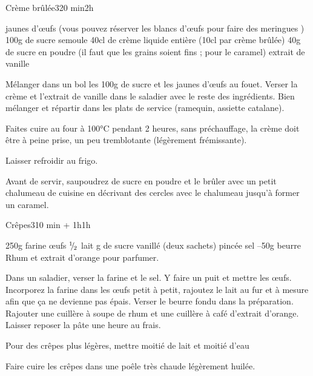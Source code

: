 \begin{recette}{Crème brûlée}{3}{20 min}{2h}
\begin{ingredients}[4 pers.]
 jaunes d'œufs (vous pouvez réserver les blancs d'œufs pour faire des meringues )
\ingredient 100g de sucre semoule
\ingredient 40cl de crème liquide entière (10cl par crème brûlée)
\ingredient 40g de sucre en poudre (il faut que les grains soient fins ; pour le caramel)
\ingredient extrait de vanille
\end{ingredients}

\begin{preparation}
\etape Mélanger dans un bol les 100g de sucre et les jaunes d'œufs au fouet.
\etape Verser la crème et l'extrait de vanille dans le saladier avec le reste des ingrédients.
\etape Bien mélanger et répartir dans les plats de service (ramequin, assiette catalane).
\end{preparation}

\begin{cuisson}
Faites cuire au four à 100°C pendant 2 heures, sans préchauffage, la crème doit être à peine prise, un peu tremblotante 
(légèrement frémissante). 

Laisser refroidir au frigo. 

Avant de servir, saupoudrez de sucre en poudre et le brûler avec un petit chalumeau de cuisine en décrivant des cercles avec le chalumeau jusqu'à former un caramel. 

\end{cuisson}


\end{recette}

\begin{recette}{Crêpes}{3}{10 min + 1h}{1h}
\begin{ingredients}
\ingredient 250g farine
 œufs
\ingredient ${{}^{1\!\!}/ _{\!2}}$ lait
 g de sucre vanillé (deux sachets)
 pincée sel
--50g beurre
\ingredient Rhum et extrait d'orange pour parfumer.
\end{ingredients}


\begin{preparation}
\etape Dans un saladier, verser la farine et le sel.
\etape Y faire un puit et mettre les œufs. Incorporez la farine dans les œufs petit à petit, rajoutez le lait au fur et à mesure afin que ça ne devienne pas épais.
\etape Verser le beurre fondu dans la préparation.
\etape Rajouter une cuillère à soupe de rhum et une cuillère à café d'extrait d'orange.
\etape Laisser reposer la pâte une heure au frais.
\end{preparation}

\begin{remarque}
Pour des crêpes plus légères, mettre moitié de lait et moitié d'eau
\end{remarque}

\begin{cuisson}
Faire cuire les crêpes dans une poêle très chaude légèrement huilée.
\end{cuisson}
\end{recette}

